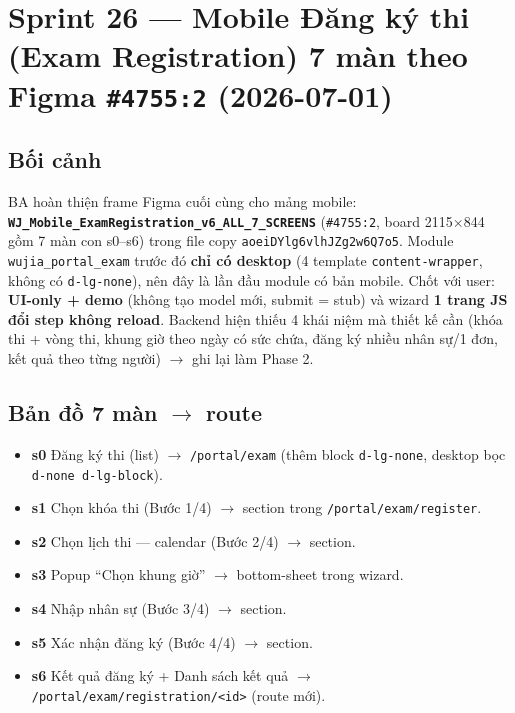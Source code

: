\chapter{Sprint 26 --- Mobile Đăng ký thi (Exam Registration) 7 màn theo Figma \texttt{\#4755:2} (2026-07-01)}

\section{Bối cảnh}

BA hoàn thiện frame Figma cuối cùng cho mảng mobile: \textbf{\texttt{WJ\_Mobile\_ExamRegistration\_v6\_ALL\_7\_SCREENS}} (\texttt{\#4755:2}, board 2115$\times$844 gồm 7 màn con s0--s6) trong file copy \texttt{aoeiDYlg6vlhJZg2w6Q7o5}. Module \texttt{wujia\_portal\_exam} trước đó \textbf{chỉ có desktop} (4 template \texttt{content-wrapper}, không có \texttt{d-lg-none}), nên đây là lần đầu module có bản mobile. Chốt với user: \textbf{UI-only + demo} (không tạo model mới, submit = stub) và wizard \textbf{1 trang JS đổi step không reload}. Backend hiện thiếu 4 khái niệm mà thiết kế cần (khóa thi + vòng thi, khung giờ theo ngày có sức chứa, đăng ký nhiều nhân sự/1 đơn, kết quả theo từng người) $\rightarrow$ ghi lại làm Phase 2.

\section{Bản đồ 7 màn $\rightarrow$ route}

\begin{itemize}
  \item \textbf{s0} Đăng ký thi (list) $\rightarrow$ \texttt{/portal/exam} (thêm block \texttt{d-lg-none}, desktop bọc \texttt{d-none d-lg-block}).
  \item \textbf{s1} Chọn khóa thi (Bước 1/4) $\rightarrow$ section trong \texttt{/portal/exam/register}.
  \item \textbf{s2} Chọn lịch thi --- calendar (Bước 2/4) $\rightarrow$ section.
  \item \textbf{s3} Popup ``Chọn khung giờ'' $\rightarrow$ bottom-sheet trong wizard.
  \item \textbf{s4} Nhập nhân sự (Bước 3/4) $\rightarrow$ section.
  \item \textbf{s5} Xác nhận đăng ký (Bước 4/4) $\rightarrow$ section.
  \item \textbf{s6} Kết quả đăng ký + Danh sách kết quả $\rightarrow$ \texttt{/portal/exam/registration/<id>} (route mới).
\end{itemize}


